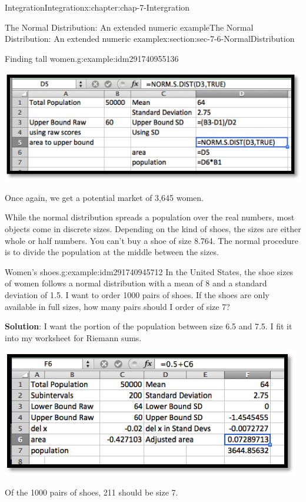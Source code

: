 \documentclass[oneside,10pt,]{book}
\newcommand{\terminology}[1]{\textbf{#1}}
\numberwithin{equation}{section}
\begin{document}
\begin{chapterptx}{Integration}{}{Integration}{}{}{x:chapter:chap-7-Intergration}
\begin{sectionptx}{The Normal Distribution: An extended numeric example}{}{The Normal Distribution: An extended numeric example}{}{}{x:section:sec-7-6-NormalDistribution}
\begin{example}{Finding tall women.}{g:example:idm291740955136}
\begin{sidebyside}{1}{0.2}{0.2}{0}
\begin{sbspanel}{0.6}
\includegraphics[width=\linewidth]{images/sec7-6-8.png}
\end{sbspanel}%
\end{sidebyside}%
\par
Once again, we get a potential market of 3,645 women.%
\end{example}
While the normal distribution spreads a population over the real numbers, most objects come in discrete sizes.  Depending on the kind of shoes, the sizes are either whole or half numbers.  You can’t buy a shoe of size 8.764.  The normal procedure is to divide the population at the middle between the sizes.%
\begin{example}{Women's shoes.}{g:example:idm291740945712}%
In the United States, the shoe sizes of women follows a normal distribution with a mean of 8 and a standard deviation of 1.5.  I want to order 1000 pairs of shoes.  If the shoes are only available in full sizes, how many pairs should I order of size 7?%
\par
\terminology{Solution}:  I want the portion of the population between size 6.5 and 7.5.   I fit it into my worksheet for Riemann sums.%
\begin{sidebyside}{1}{0.25}{0.25}{0}%
\begin{sbspanel}{0.5}%
\includegraphics[width=\linewidth]{images/sec7-6-7.png}
\end{sbspanel}%
\end{sidebyside}%
\par
Of the 1000 pairs of shoes, 211 should be size 7.%

\end{example}
\end{sectionptx}
\end{chapterptx}
\end{document}
